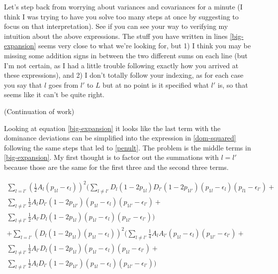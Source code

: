 \documentclass[a4paper,10pt]{article}
\newcommand{\jb}[1]{{\color{blue} (#1)} }
\begin{document}
    Let's step back from worrying about variances and covariances for
    a minute (I think I was trying to have you solve too many steps at
    once by suggesting to focus on that interpretation). See if you
    can see your way to verifying my intuition about the above
    expressions. The stuff you have written in lines
    \eqref{big-expansion} seems very close to what we're looking for,
    but 1) I think you may be missing some addition signs in between
    the two different sums on each line (but I'm not certain, as I had
    a little trouble following exactly how you arrived at these
    expressions), and 2) I don't totally follow your indexing, as for
    each case you say that $l$ goes from $l'$ to $L$ but at no point
    is it specified what $l'$ is, so that seems like it can't be quite
    right.



 \vspace{10mm}

 \jb{Continuation of work}

 \vspace{5mm}

 Looking at equation \eqref{big-expansion} it looks like the last
 term with the dominance deviations can be simplified into the
 expression in \eqref{dom-squared} following the same steps that led
 to \eqref{penult}. The problem is the middle terms in
 \eqref{big-expansion}. My first thought is to factor out the
 summations with $l=l'$ because those are the same for the first three
 and the second three terms. 

 \begin{equation}
   \begin{split}   
   \sum_{l=l'}(\frac{1}{2}A_l(p_{1l}-\epsilon_l))^2 (\sum_{l
     \neq
     l'}D_l(1-2p_{1l})D_{l'}(1-2p_{1l'})(p_{1l}-\epsilon_l)(p_{l1}-\epsilon_{l'})+
   \\
   \sum_{l \neq l'}\frac{1}{2}A_{l}D_{l'}(1-2p_{1l'})(p_{1l}-\epsilon_l)(p_{1l'}-\epsilon_{l'})+
   \\
   \sum_{l \neq l'}\frac{1}{2}A_{l'}D_l(1-2p_{1l})(p_{1l}-\epsilon_l)(p_{1l'}-\epsilon_{l'}))
   \\
   + \sum_{l=l'}(D_l(1-2p_{1l})(p_{1l}-\epsilon_l))^2 (\sum_{l
     \neq l'}\frac{1}{4}A_lA_{l'}(p_{1l}-\epsilon_l)(p_{1l'}-\epsilon_{l'})+
   \\
   \sum_{l \neq l'}\frac{1}{2}A_{l'}D_l(1-2p_{1l})(p_{1l}-\epsilon_l)(p_{1l}-\epsilon_{l'})+
   \\
   \sum_{l \neq l'} \frac{1}{2}A_{l}D_{l'}(1-2p_{1l'})(p_{1l}-\epsilon_l)(p_{1l'}-\epsilon_{l'}))
   \end{split}
\end{equation}\label{factored} 
\end{document}
